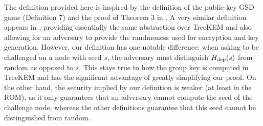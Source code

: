The definition provided here is inspired by the definition of the public-key GSD game (Definition 7) and the proof of Theorem 3 in \cite{ttkem}. A very similar definition appears in \cite{modular-group-messaging}, providing essentially the same abstraction over TreeKEM and also allowing for an adversary to provide the randmoness used for encryption and key generation. However, our definition has one notable difference: when asking to be challenged on a node with seed $s$, the adversary must distinguish $H_\mathrm{dep}(s)$ from random as opposed to $s$. This stays true to how the group key is computed in TreeKEM and has the significant advantage of greatly simplifying our proof. On the other hand, the security implied by our definition is weaker (at least in the ROM), as it only guarantees that an adversary cannot compute the seed of the challenge node, whereas the other definitions guarantee that this seed cannot be distinguished from random.

